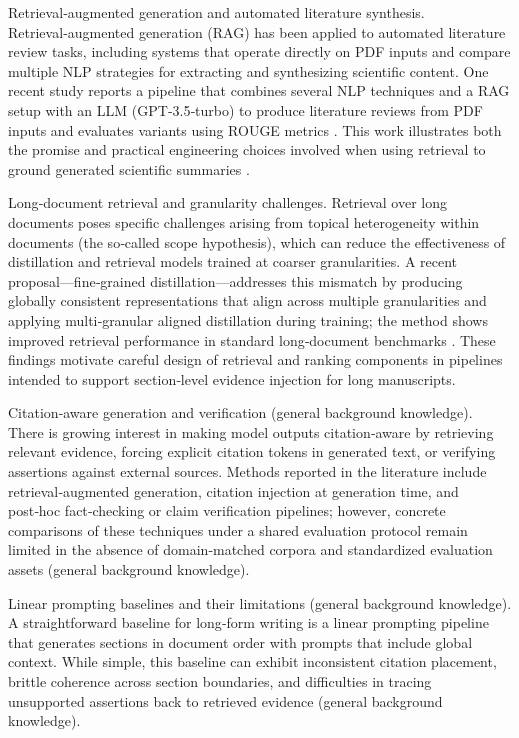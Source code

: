 \documentclass{article}%
\begin{document}
Retrieval‑augmented generation and automated literature synthesis. Retrieval‑augmented generation (RAG) has been applied to automated literature review tasks, including systems that operate directly on PDF inputs and compare multiple NLP strategies for extracting and synthesizing scientific content. One recent study reports a pipeline that combines several NLP techniques and a RAG setup with an LLM (GPT‑3.5‑turbo) to produce literature reviews from PDF inputs and evaluates variants using ROUGE metrics \cite{2411.18583v1}. This work illustrates both the promise and practical engineering choices involved when using retrieval to ground generated scientific summaries \cite{2411.18583v1}.

Long‑document retrieval and granularity challenges. Retrieval over long documents poses specific challenges arising from topical heterogeneity within documents (the so‑called scope hypothesis), which can reduce the effectiveness of distillation and retrieval models trained at coarser granularities. A recent proposal---fine‑grained distillation---addresses this mismatch by producing globally consistent representations that align across multiple granularities and applying multi‑granular aligned distillation during training; the method shows improved retrieval performance in standard long‑document benchmarks \cite{2212.10423v1}. These findings motivate careful design of retrieval and ranking components in pipelines intended to support section‑level evidence injection for long manuscripts.

Citation‑aware generation and verification (general background knowledge). There is growing interest in making model outputs citation‑aware by retrieving relevant evidence, forcing explicit citation tokens in generated text, or verifying assertions against external sources. Methods reported in the literature include retrieval‑augmented generation, citation injection at generation time, and post‑hoc fact‑checking or claim verification pipelines; however, concrete comparisons of these techniques under a shared evaluation protocol remain limited in the absence of domain‑matched corpora and standardized evaluation assets (general background knowledge).

Linear prompting baselines and their limitations (general background knowledge). A straightforward baseline for long‑form writing is a linear prompting pipeline that generates sections in document order with prompts that include global context. While simple, this baseline can exhibit inconsistent citation placement, brittle coherence across section boundaries, and difficulties in tracing unsupported assertions back to retrieved evidence (general background knowledge).
\end{document}
